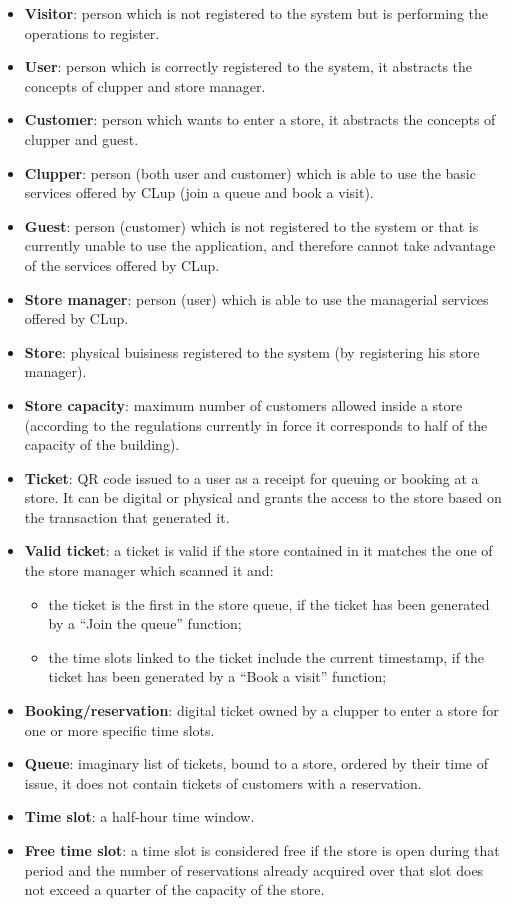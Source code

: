 \begin{itemize}
\tightlist
\item
  \textbf{Visitor}: person which is not registered to the system but is
  performing the operations to register.
\item
  \textbf{User}: person which is correctly registered to the system, it
  abstracts the concepts of clupper and store manager.
\item
  \textbf{Customer}: person which wants to enter a store, it abstracts
  the concepts of clupper and guest.
\item
  \textbf{Clupper}: person (both user and customer) which is able to use
  the basic services offered by CLup (join a queue and book a visit).
\item
  \textbf{Guest}: person (customer) which is not registered to the
  system or that is currently unable to use the application, and
  therefore cannot take advantage of the services offered by CLup.
\item
  \textbf{Store manager}: person (user) which is able to use the
  managerial services offered by CLup.
\item
  \textbf{Store}: physical buisiness registered to the system (by
  registering his store manager).
\item
  \textbf{Store capacity}: maximum number of customers allowed inside a
  store (according to the regulations currently in force it corresponds
  to half of the capacity of the building).
\item
  \textbf{Ticket}: QR code issued to a user as a receipt for queuing or
  booking at a store. It can be digital or physical and grants the
  access to the store based on the transaction that generated it.
\item
  \textbf{Valid ticket}: a ticket is valid if the store contained in it
  matches the one of the store manager which scanned it and:

  \begin{itemize}
  \tightlist
  \item
    the ticket is the first in the store queue, if the ticket has been
    generated by a ``Join the queue'' function;
  \item
    the time slots linked to the ticket include the current timestamp,
    if the ticket has been generated by a ``Book a visit'' function;
  \end{itemize}
\item
  \textbf{Booking/reservation}: digital ticket owned by a clupper to
  enter a store for one or more specific time slots.
\item
  \textbf{Queue}: imaginary list of tickets, bound to a store, ordered
  by their time of issue, it does not contain tickets of customers with
  a reservation.
\item
  \textbf{Time slot}: a half-hour time window.
\item
  \textbf{Free time slot}: a time slot is considered free if the store
  is open during that period and the number of reservations already
  acquired over that slot does not exceed a quarter of the capacity of
  the store.
\end{itemize}

